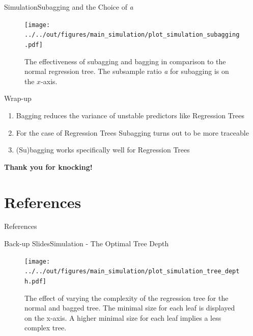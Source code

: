 \documentclass{beamer}
\begin{document}
\begin{frame}{Simulation}{Subagging and the Choice of \textit{a}}
\begin{center}
\begin{figure}
\texttt{[image: ../../out/figures/main\_simulation/plot\_simulation\_subagging.pdf]}
\caption{The effectiveness of subagging and bagging in comparison to the normal regression tree. The subsample ratio \textit{a} for subagging is on the $x$-axis.}
\end{figure}
\end{center}
\end{frame}


\begin{frame}{Wrap-up}
\begin{enumerate}
\item Bagging reduces the variance of unstable predictors like Regression Trees
\item For the case of Regression Trees Subagging turns out to be more traceable
\item (Su)bagging works specifically well for Regression Trees
\end{enumerate}
\end{frame}

\begin{frame}
\begin{center}
\textbf{Thank you for knocking!
}\end{center}

\end{frame}



\section{References}
\begin{frame}{References}


\end{frame}


\appendix

\begin{frame}{Back-up Slides}{Simulation - The Optimal Tree Depth}
\begin{center}
\begin{figure}
\texttt{[image: ../../out/figures/main\_simulation/plot\_simulation\_tree\_depth.pdf]}
\caption{The effect of varying the complexity of the regression tree for the normal and bagged tree. The minimal size for each leaf is displayed on the x-axis. A higher minimal size for each leaf implies a less complex tree.}
\end{figure}
\end{center}
\end{frame}
\end{document}
